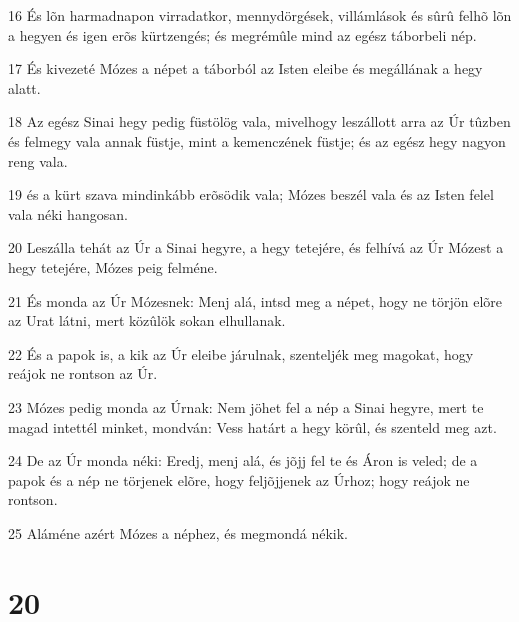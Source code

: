 \par 16 És lõn harmadnapon virradatkor, mennydörgések, villámlások és sûrû felhõ lõn a hegyen és igen erõs kürtzengés; és megrémûle mind az egész táborbeli nép.
\par 17 És kivezeté Mózes a népet a táborból az Isten eleibe és megállának a hegy alatt.
\par 18 Az egész Sinai hegy pedig füstölög vala, mivelhogy leszállott arra az Úr tûzben és felmegy vala annak füstje, mint a kemenczének füstje; és az egész hegy nagyon reng vala.
\par 19 és a kürt szava mindinkább erõsödik vala; Mózes beszél vala és az Isten felel vala néki hangosan.
\par 20 Leszálla tehát az Úr a Sinai hegyre, a hegy tetejére, és felhívá az Úr Mózest a hegy tetejére, Mózes peig felméne.
\par 21 És monda az Úr Mózesnek: Menj alá, intsd meg a népet, hogy ne törjön elõre az Urat látni, mert közûlök sokan elhullanak.
\par 22 És a papok is, a kik az Úr eleibe járulnak, szenteljék meg magokat, hogy reájok ne rontson az Úr.
\par 23 Mózes pedig monda az Úrnak: Nem jöhet fel a nép a Sinai hegyre, mert te magad intettél minket, mondván: Vess határt a hegy körûl, és szenteld meg azt.
\par 24 De az Úr monda néki: Eredj, menj alá, és jõjj fel te és Áron is veled; de a papok és a nép ne törjenek elõre, hogy feljõjjenek az Úrhoz; hogy reájok ne rontson.
\par 25 Aláméne azért Mózes a néphez, és megmondá nékik.

\chapter{20}


